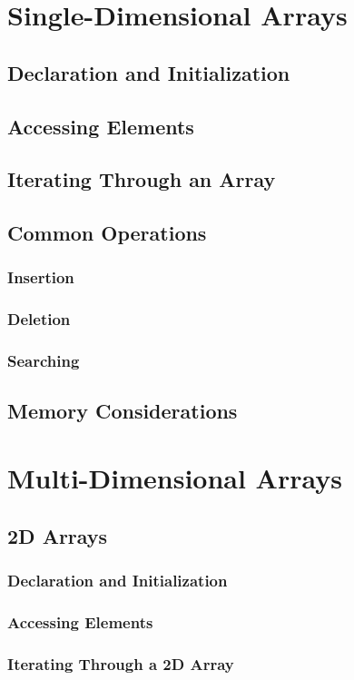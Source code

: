 \documentclass[12pt, oneside]{book}
\begin{document}
	\section{Single-Dimensional Arrays}
	\subsection{Declaration and Initialization}
	\subsection{Accessing Elements}
	\subsection{Iterating Through an Array}
	\subsection{Common Operations}
	\subsubsection{Insertion}
	\subsubsection{Deletion}
	\subsubsection{Searching}
	\subsection{Memory Considerations}
	\section{Multi-Dimensional Arrays}
	\subsection{2D Arrays}
	\subsubsection{Declaration and Initialization}
	\subsubsection{Accessing Elements}
	\subsubsection{Iterating Through a 2D Array}
\end{document}
